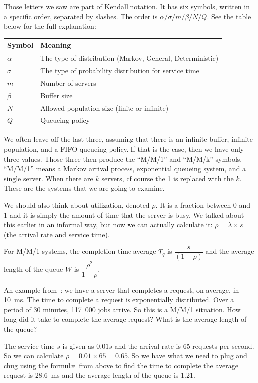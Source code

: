 Those letters we saw are part of Kendall notation. It has six symbols, written in a specific order, separated by slashes. The order is $\alpha / \sigma / m / \beta / N / Q$. See the table below for the full explanation:

\begin{center}
\begin{tabular}{l|l} 
	\textbf{Symbol} & \textbf{Meaning} \\ \hline
	$\alpha$ & The type of distribution (Markov, General, Deterministic) \\ \hline
	$\sigma$ & The type of probability distribution for service time \\ \hline
	$m$ & Number of servers \\ \hline
	$\beta$ & Buffer size \\ \hline
	$N$ & Allowed population size (finite or infinite) \\ \hline
	$Q$ & Queueing policy \\ 
\end{tabular}
\end{center}

We often leave off the last three, assuming that there is an infinite buffer, infinite population, and a FIFO queueing policy. If that is the case, then we have only three values. Those three then produce the ``M/M/1'' and ``M/M/k'' symbols. ``M/M/1'' means a Markov arrival process, exponential queueing system, and a single server. When there are $k$ servers, of course the 1 is replaced with the $k$. These are the systems that we are going to examine.

We should also think about utilization, denoted $\rho$. It is a fraction between 0 and 1 and it is simply the amount of time that the server is busy. We talked about this earlier in an informal way, but now we can actually calculate it: $\rho = \lambda \times s$ (the arrival rate and service time). 

For M/M/1 systems, the completion time average $T_{q}$ is $\dfrac{s}{(1-\rho)}$ and the average length of the queue $W$ is $\dfrac{\rho^{2}}{1-\rho}$.

An example from~\cite{williams-q}: we have a server that completes a request, on average, in 10~ms. The time to complete a request is exponentially distributed. Over a period of 30 minutes, 117~000 jobs arrive. So this is a M/M/1 situation. How long did it take to complete the average request? What is the average length of the queue?

The service time $s$ is given as $0.01s$ and the arrival rate is 65 requests per second. So we can calculate $\rho = 0.01 \times 65 = 0.65$. So we have what we need to plug and chug using the formul\ae\ from above to find the time to complete the average request is 28.6~ms and the average length of the queue is 1.21.

